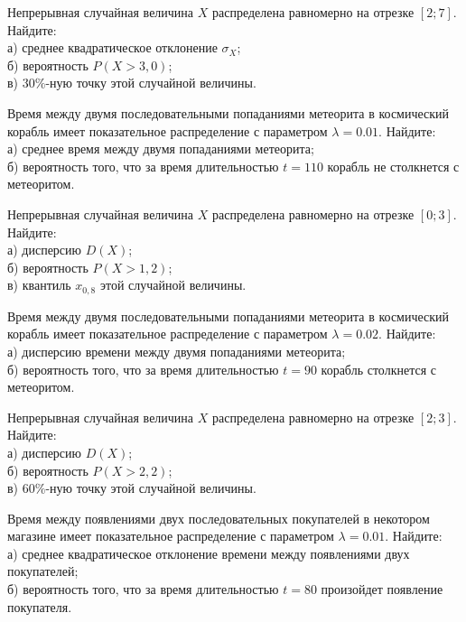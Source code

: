 \vfill

\newpage\setcounter{zad}{0}

\z Непрерывная случайная величина $X$ распределена равномерно на отрезке $[2; 7]$. Найдите: \\ \quad а) среднее квадратическое отклонение $\sigma_X$; \\ \quad б) вероятность $P(X>3{,}0)$; \\ \quad в) $30\%$-ную точку этой случайной величины.


\vfill

\z Время между двумя последовательными попаданиями метеорита в космический корабль имеет показательное распределение с параметром $\lambda = 0.01$. Найдите: \\ \quad а) среднее время между двумя попаданиями метеорита; \\ \quad б) вероятность того, что за время длительностью $t = 110$ корабль не столкнется с метеоритом.
 

\vfill

\newpage\setcounter{zad}{0}

\z Непрерывная случайная величина $X$ распределена равномерно на отрезке $[0; 3]$. Найдите: \\ \quad а) дисперсию $D(X)$; \\ \quad б) вероятность $P(X>1{,}2)$; \\ \quad в) квантиль $x_{0{,}8}$ этой случайной величины.


\vfill

\z Время между двумя последовательными попаданиями метеорита в космический корабль имеет показательное распределение с параметром $\lambda = 0.02$. Найдите: \\ \quad а) дисперсию времени между двумя попаданиями метеорита; \\ \quad б) вероятность того, что за время длительностью $t = 90$ корабль  столкнется с метеоритом.
 

\vfill

\newpage\setcounter{zad}{0}

\z Непрерывная случайная величина $X$ распределена равномерно на отрезке $[2; 3]$. Найдите: \\ \quad а) дисперсию $D(X)$; \\ \quad б) вероятность $P(X>2{,}2)$; \\ \quad в) $60\%$-ную точку этой случайной величины.


\vfill

\z Время между появлениями двух последовательных покупателей в некотором магазине имеет показательное распределение с параметром $\lambda = 0.01$. Найдите: \\ \quad а) среднее квадратическое отклонение времени между появлениями двух покупателей; \\ \quad б) вероятность того, что за время длительностью $t = 80$  произойдет появление покупателя.
 

